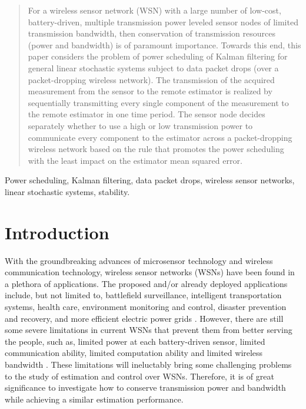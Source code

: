 \documentclass[journal]{IEEEtran}
\begin{document}
\begin{abstract}
For a wireless sensor network (WSN) with a large number of low-cost, battery-driven, multiple transmission power leveled sensor nodes of limited transmission bandwidth, then conservation of transmission resources (power and bandwidth) is of paramount importance. Towards this end, this paper considers the problem of power scheduling of Kalman filtering for general linear stochastic systems subject to data packet drops (over a packet-dropping wireless network). The transmission of the acquired measurement from the sensor to the remote estimator is realized by sequentially transmitting every single component of the measurement to the remote estimator in one time period. The sensor node decides separately whether to use a high or low transmission power to communicate every component to the estimator across a packet-dropping wireless network based on the rule that promotes the power scheduling with the least impact on the estimator mean squared error. {\color{black}{Under the customary assumption that the predicted density is (approximately) Gaussian, leveraging the statistical distribution of sensor data, the mechanism of power scheduling, the wireless network effect and the received data, the minimum mean squared error estimator is derived. By investigating the statistical convergence properties of the estimation error covariance, we establish, for general linear systems, both the sufficient condition and the necessary condition guaranteeing the stability of the estimator.}}
\end{abstract}

\begin{IEEEkeywords}
Power scheduling, Kalman filtering, data packet drops, wireless sensor networks, linear stochastic systems, stability.
\end{IEEEkeywords}


\section{Introduction}
\label{section 1}
With the groundbreaking advances of microsensor technology and wireless communication technology, wireless sensor
networks (WSNs) have been found in a plethora of applications. The proposed and/or already deployed applications include, but not limited to, battlefield surveillance, intelligent transportation systems, health care, environment monitoring and control, disaster prevention and recovery, and more efficient electric power grids \cite{cn2002su, tsp2006ribeiro1, tsp2006ribeiro2, tsp2006ribeiro, tsp2008msechu, tsp2012msechu, tac2012jia}. However, there are still some severe limitations in current WSNs that prevent them from better serving the people, such as, limited power at each battery-driven sensor, limited communication ability, limited computation ability and limited wireless bandwidth \cite{tac2012jia}. These limitations will ineluctably bring some challenging problems to the study of estimation and control over WSNs. Therefore, it is of great significance to investigate how to conserve transmission power and bandwidth while achieving a similar estimation performance.
\end{document}

